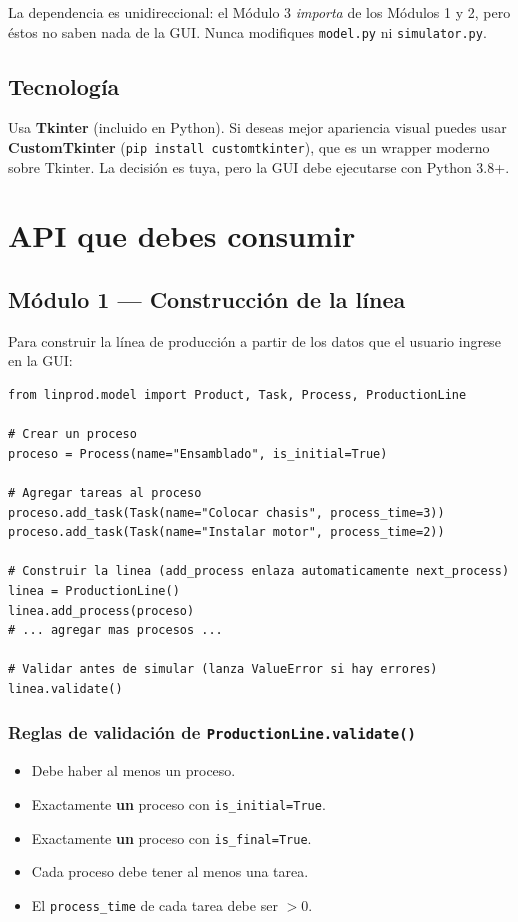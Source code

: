 \documentclass[12pt,letterpaper]{article}
\begin{document}
La dependencia es unidireccional: el Módulo 3 \emph{importa} de los Módulos 1
y 2, pero éstos no saben nada de la GUI. Nunca modifiques \texttt{model.py} ni
\texttt{simulator.py}.

\subsection{Tecnología}

Usa \textbf{Tkinter} (incluido en Python). Si deseas mejor apariencia visual
puedes usar \textbf{CustomTkinter} (\texttt{pip install customtkinter}), que es
un wrapper moderno sobre Tkinter. La decisión es tuya, pero la GUI debe
ejecutarse con Python 3.8+.

\section{API que debes consumir}

\subsection{Módulo 1 — Construcción de la línea}

Para construir la línea de producción a partir de los datos que el usuario
ingrese en la GUI:

\begin{lstlisting}
from linprod.model import Product, Task, Process, ProductionLine

# Crear un proceso
proceso = Process(name="Ensamblado", is_initial=True)

# Agregar tareas al proceso
proceso.add_task(Task(name="Colocar chasis", process_time=3))
proceso.add_task(Task(name="Instalar motor", process_time=2))

# Construir la linea (add_process enlaza automaticamente next_process)
linea = ProductionLine()
linea.add_process(proceso)
# ... agregar mas procesos ...

# Validar antes de simular (lanza ValueError si hay errores)
linea.validate()
\end{lstlisting}

\subsubsection{Reglas de validación de \texttt{ProductionLine.validate()}}

\begin{itemize}[leftmargin=2em]
    \item Debe haber al menos un proceso.
    \item Exactamente \textbf{un} proceso con \texttt{is\_initial=True}.
    \item Exactamente \textbf{un} proceso con \texttt{is\_final=True}.
    \item Cada proceso debe tener al menos una tarea.
    \item El \texttt{process\_time} de cada tarea debe ser $> 0$.
\end{itemize}
\end{document}

